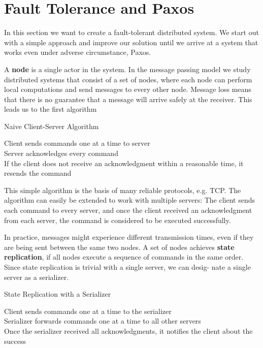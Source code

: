 \section{Fault Tolerance and Paxos}

In this section we want to create a fault-tolerant distributed system. We start out with a simple approach and improve our solution until we arrive at a system that works even under adverse circumstance, Paxos. \medskip

A \textbf{node} is a single actor in the system. In the message passing model we study distributed systems that consist of a set of nodes, where each node can perform local computations and send messages to every other node. Message loss means that there is no guarantee that a message will arrive safely at the receiver. This leads us to the first algorithm \medskip

\begin{algorithm}[H]
\caption{Naive Client-Server Algorithm}
	Client sends commands one at a time to server\\
	Server acknowledges every command\\
	If the client does not receive an acknowledgment within a reasonable time, it resends the command
\end{algorithm}

\medskip

This simple algorithm is the basis of many reliable protocols, e.g. TCP. The algorithm can easily be extended to work with multiple servers: The client sends each command to every server, and once the client received an acknowledgment from each server, the command is considered to be executed successfully. \medskip

In practice, messages might experience different transmission times, even if they are being sent between the same two nodes. A set of nodes achieves \textbf{state replication}, if all nodes execute a sequence of commands in the same order. Since state replication is trivial with a single server, we can desig- nate a single server as a serializer. \medskip

\begin{algorithm}[H]
\caption{State Replication with a Serializer}
	Client sends commands one at a time to the serializer\\
	Serializer forwards commands one at a time to all other servers\\
	Once the serializer received all acknowledgments, it notifies the client about the success
\end{algorithm}

